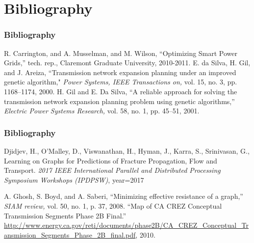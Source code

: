 \section{Bibliography}

\begin{frame}
\frametitle{Bibliography}
\begin{thebibliography}{CGU, 2011}
R. Carrington, and  A. Musselman, and M. Wilson, ``Optimizing Smart Power Grids,'' tech. rep., Claremont Graduate University, 2010-2011.
E. da Silva, H. Gil, and J. Areiza, ``Transmission network expansion planning under an improved genetic algorithm," {\em Power Systems, IEEE Transactions on,} vol. 15, no. 3, pp. 1168–1174, 2000. 
H. Gil and E. Da Silva, ``A reliable approach for solving the transmission network expansion planning problem using genetic algorithms,'' {\em Electric Power Systems Research,} vol. 58, no. 1, pp. 45–51, 2001.
\end{thebibliography}
\end{frame}

\begin{frame}
\frametitle{Bibliography}
\begin{thebibliography}{CGU, 2011}
Djidjev, H., O'Malley, D., Viswanathan, H., Hyman, J., Karra, S., Srinivasan, G., Learning on Graphs for Predictions of Fracture Propagation, Flow and Transport. {\em 2017 IEEE International Parallel and Distributed Processing Symposium Workshops (IPDPSW)}, year={2017}

A. Ghosh, S. Boyd, and A. Saberi, ``Minimizing effective resistance of a graph,'' {\em SIAM review,} vol. 50, no. 1, p. 37, 2008.
``Map of {C}{A} {C}{R}{E}{Z} Conceptual Transmission Segments Phase 2B Final.'' \url{http://www.energy.ca.gov/reti/documents/phase2B/CA_CREZ_Conceptual_Transmission_Segments_Phase_2B_final.pdf}, 2010.
\end{thebibliography}
\end{frame}

